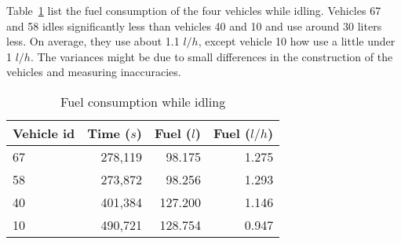 Table~\ref{tb:idleFuelConsumption} list the fuel consumption of the four vehicles while idling.
Vehicles 67 and 58 idles significantly less than vehicles 40 and 10 and use around 30 liters less.
On average, they use about 1.1 $l/h$, except vehicle 10 how use a little under 1 $l/h$.
The variances might be due to small differences in the construction of the vehicles and measuring inaccuracies.
\begin{table}
\centering
\begin{tabular}{l|r|r|r}
Vehicle id & Time ($s$) & Fuel ($l$) &  Fuel ($l/h$)\\\hline
67 & 278,119 & 98.175 & 1.275\\\hline
58 & 273,872 & 98.256 & 1.293\\\hline
40 & 401,384 & 127.200 & 1.146\\\hline
10 & 490,721 & 128.754 & 0.947
\end{tabular}
\caption{Fuel consumption while idling}
\label{tb:idleFuelConsumption}
\end{table}


